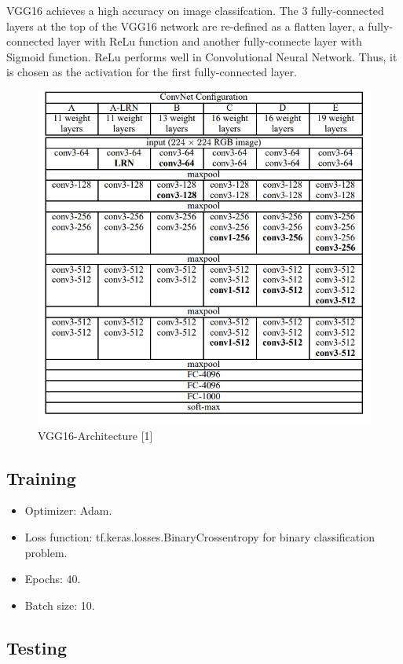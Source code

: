 \documentclass[a4paper,12pt]{article}
\begin{document}
\hfill \break

VGG16 achieves a high accuracy on image classifcation. 
The 3 fully-connected layers at the top of the VGG16 network are re-defined 
as a flatten layer, a fully-connected layer with ReLu function 
and another fully-connecte layer with Sigmoid function.
ReLu performs well in Convolutional Neural Network. 
Thus, it is chosen as the activation for the first fully-connected layer.

\begin{figure}[H]
  \centering
  \includegraphics[width=12cm]{./images/vgg16-architecture.png}
     \caption{VGG16-Architecture [1]
             }
        \label{vgg16-architecture}
\end{figure}

\subsection{Training}
\begin{itemize}
  \item Optimizer: Adam.
  \item Loss function: tf.keras.losses.BinaryCrossentropy for binary classification problem.
  \item Epochs: 40.
  \item Batch size: 10.
\end{itemize}

\subsection{Testing}
\end{document}
